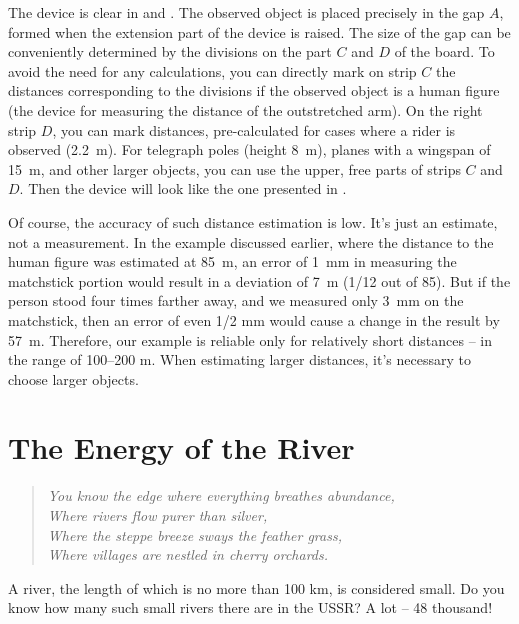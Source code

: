 The device is clear in  and . The observed object is placed precisely in the gap $A$, formed when the extension part of the device is raised. The size of the gap can be conveniently determined by the divisions on the part $C$ and $D$ of the board. To avoid the need for any calculations, you can directly mark on strip $C$ the distances corresponding to the divisions if the observed object is a human figure (the device for measuring the distance of the outstretched arm). On the right strip $D$, you can mark distances, pre-calculated for cases where a rider is observed (\SI{2.2}{\meter}). For telegraph poles (height \SI{8}{\meter}), planes with a wingspan of \SI{15}{\meter}, and other larger objects, you can use the upper, free parts of strips $C$ and $D.$ Then the device will look like the one presented in .





Of course, the accuracy of such distance estimation is low. It's just an estimate, not a measurement. In the example discussed earlier, where the distance to the human figure was estimated at \SI{85}{\meter}, an error of \SI{1}{\milli\meter} in measuring the matchstick portion would result in a deviation of \SI{7}{\meter} (1/12 out of 85). But if the person stood four times farther away, and we measured only \SI{3}{\milli\meter} on the matchstick, then an error of even 1/2 mm would cause a change in the result by \SI{57}{\meter}. Therefore, our example is reliable only for relatively short distances -- in the range of 100--200 m. When estimating larger distances, it's necessary to choose larger objects.


\section{The Energy of the River}
\label{sec-2.6}

\begin{quote}
\emph{You know the edge where everything breathes abundance,\\
Where rivers flow purer than silver, \\
Where the steppe breeze sways the feather grass, \\
Where villages are nestled in cherry orchards.}\\[-10pt]
\end{quote}


A river, the length of which is no more than 100 km, is considered small. Do you know how many such small rivers there are in the USSR? A lot -- 48 thousand!

